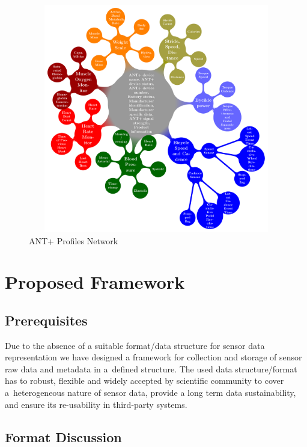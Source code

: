 \documentclass[conference]{IEEEtran}
\begin{document}
\begin{figure}
\centering\includegraphics[width=12cm, height=10cm]{AntPlusProfiles}
\caption{\label{AntPlus}ANT+ Profiles Network}
\end{figure}


\section{Proposed Framework}\label{sec:framework}

\subsection{Prerequisites}\label{sec:requirements}

Due to the absence of a suitable format/data structure for sensor data representation we have designed a framework for collection and storage of sensor raw data and metadata in a~defined structure. The used data structure/format has to robust, flexible and widely accepted by scientific community to cover a~heterogeneous nature of sensor data, provide a long term data sustainability, and ensure its re-usability in third-party systems.

\subsection{Format Discussion}
\end{document}

